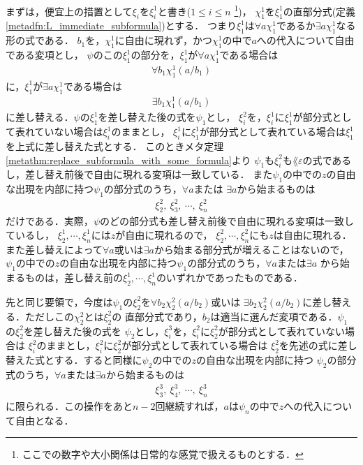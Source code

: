 	まずは，便宜上の措置として$\xi_{i}$を$\xi_{i}^{1}$と書き($1 \leq i \leq n$
	\footnote{
		ここでの数字や大小関係は日常的な感覚で扱えるものとする．
	})，
	$\chi_{1}^{1}$を$\xi_{1}^{1}$の直部分式(定義\ref{metadfn:L_immediate_subformula})とする．
	つまり$\xi_{1}^{1}$は$\forall a \chi_{1}^{1}$であるか$\exists a \chi_{1}^{1}$なる形の式である．
	$b_{1}$を，$\chi_{1}^{1}$に自由に現れず，かつ$\chi_{1}^{1}$の中で$a$への代入について自由である変項とし，
	$\psi$のこの$\xi_{1}^{1}$の部分を，$\xi_{1}^{1}$が$\forall a \chi_{1}^{1}$である場合は
	\begin{align}
		\forall b_{1} \chi_{1}^{1}(a/b_{1})
	\end{align}
	に，$\xi_{1}^{1}$が$\exists a \chi_{1}^{1}$である場合は
	\begin{align}
		\exists b_{1} \chi_{1}^{1}(a/b_{1})
	\end{align}
	に差し替える．$\psi$の$\xi_{1}^{1}$を差し替えた後の式を$\psi_{1}$とし，
	$\xi_{i}^{2}$を，$\xi_{i}^{1}$に$\xi_{1}^{1}$が部分式として表れていない場合は$\xi_{i}^{1}$のままとし，
	$\xi_{i}^{1}$に$\xi_{1}^{1}$が部分式として表れている場合は$\xi_{1}^{1}$を上式に差し替えた式とする．
	このときメタ定理\ref{metathm:replace_subformula_with_some_formula}より
	$\psi_{1}$も$\xi_{i}^{2}$も$\lang{\varepsilon}$の式であるし，差し替え前後で自由に現れる変項は一致している．
	また$\psi_{1}$の中での$z$の自由な出現を内部に持つ$\psi_{1}$の部分式のうち，$\forall a$または
	$\exists a$から始まるものは
	\begin{align}
		\xi_{2}^{2},\ \xi_{3}^{2},\ \cdots,\ \xi_{n}^{2}
	\end{align}
	だけである．実際，$\psi$のどの部分式も差し替え前後で自由に現れる変項は一致しているし，
	$\xi_{2}^{1},\cdots,\xi_{n}^{1}$には$z$が自由に現れるので，
	$\xi_{2}^{2},\cdots,\xi_{n}^{2}$にも$z$は自由に現れる．
	また差し替えによって$\forall a$或いは$\exists a$から始まる部分式が増えることはないので，
	$\psi_{1}$の中での$z$の自由な出現を内部に持つ$\psi_{1}$の部分式のうち，$\forall a$または$\exists a$
	から始まるものは，差し替え前の$\xi_{2}^{1},\cdots,\xi_{n}^{1}$のいずれかであったものである．
	
	先と同じ要領で，今度は$\psi_{1}$の$\xi_{2}^{2}$を$\forall b_{2} \chi_{2}^{2}(a/b_{2})$或いは
	$\exists b_{2}\chi_{2}^{2}(a/b_{2})$に差し替える．ただしこの$\chi_{2}^{2}$とは$\xi_{2}^{2}$の
	直部分式であり，$b_{2}$は適当に選んだ変項である．$\psi_{1}$の$\xi_{2}^{2}$を差し替えた後の式を
	$\psi_{2}$とし，$\xi_{i}^{3}$を，$\xi_{i}^{2}$に$\xi_{2}^{2}$が部分式として表れていない場合は
	$\xi_{i}^{2}$のままとし，$\xi_{i}^{2}$に$\xi_{2}^{2}$が部分式として表れている場合は
	$\xi_{2}^{2}$を先述の式に差し替えた式とする．すると同様に$\psi_{2}$の中での$z$の自由な出現を内部に持つ
	$\psi_{2}$の部分式のうち，$\forall a$または$\exists a$から始まるものは
	\begin{align}
		\xi_{3}^{3},\ \xi_{4}^{3},\ \cdots,\ \xi_{n}^{3}
	\end{align}
	に限られる．この操作をあと$n-2$回継続すれば，$a$は$\psi_{n}$の中で$z$への代入について自由となる．
	\QED
			
